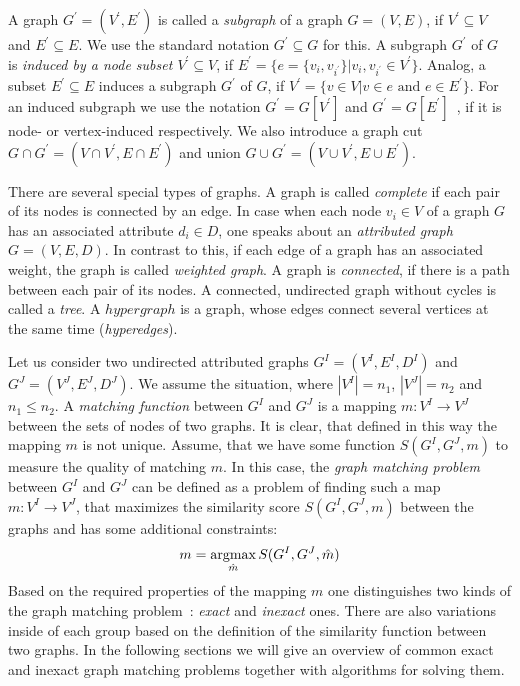 A graph $G^\prime=(V^\prime,E^\prime)$ is called a \emph{subgraph} of a graph $G=(V,E)$, if $V^\prime\subseteq V$ and $E^\prime\subseteq E$. We use the standard notation $G^\prime\subseteq G$ for this. A subgraph $G^\prime$ of $G$ is \emph{induced by a node subset $V^\prime\subseteq V$}, if $E^\prime=\{e=\{v_i, v_{i^\prime}\}|v_i,v_{i^\prime}\in V^\prime\}$. Analog, a subset $E^\prime\subseteq E$ induces a subgraph $G^\prime$ of $G$, if $V^\prime=\{v\in V|v\in e\text{ and }e\in E^\prime\}$. For an induced subgraph we use the notation $G^\prime=G[V^\prime]$ and $G^\prime=G[E^\prime]$~\cite{Diestel2000}, if it is node- or vertex-induced respectively. We also introduce a graph cut $G\cap G^\prime=(V\cap V^\prime, E\cap E^\prime)$ and union $G\cup G^\prime=(V\cup V^\prime, E\cup E^\prime)$.

There are several special types of graphs. A graph is called \emph{complete} if each pair of its nodes is connected by an edge. In case when each node $v_i\in V$ of a graph $G$ has an associated attribute $d_i\in D$, one speaks about an \emph{attributed graph} $G=(V,E,D)$. In contrast to this, if each edge of a graph has an associated weight, the graph is called \emph{weighted graph}. A graph is \emph{connected}, if there is a path between each pair of its nodes. A connected, undirected graph without cycles is called a \emph{tree}. A $hypergraph$ is a graph, whose edges connect several vertices at the same time (\emph{hyperedges}).

Let us consider two undirected attributed graphs $G^I = (V^I, E^I, D^I)$ and $G^J = (V^J, E^J,D^J)$. We assume the situation, where $|V^I|=n_1$, $|V^J|=n_2$ and $n_1\le n_2$. A \emph{matching function} between $G^I$ and $G^J$ is a mapping $m:V^I\rightarrow V^J$ between the sets of nodes of two graphs.
It is clear, that defined in this way the mapping $m$ is not unique. Assume, that we have some function $S(G^I, G^J, m)$ to measure the quality of matching $m$. In this case, the \emph{graph matching problem} between $G^I$ and $G^J$ can be defined as a problem of finding such a map $m:V^I\rightarrow V^J$, that maximizes the similarity score $S(G^I, G^J, m)$ between the graphs and has some additional constraints:
\begin{equation} \label{gGMP}
m = \mathop{\rm argmax}_{\hat{m}}S(G^I, G^J, \hat{m})
\end{equation}
Based on the required properties of the mapping $m$ one distinguishes two kinds of the graph matching problem~\cite{Conte2004}: \emph{exact} and \emph{inexact} ones. There are also variations inside of each group based on the definition of the similarity function between two graphs. In the following sections we will give an overview of common exact and inexact graph matching problems together with algorithms for solving them.
